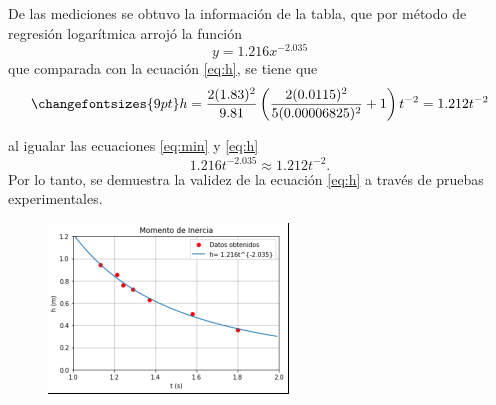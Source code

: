 \begin{minipage}{0.6\linewidth}
    De las mediciones se obtuvo la información de la tabla, que por método de
regresión logarítmica arrojó la función
\begin{equation}
    y=1.216x^{-2.035}
    \label{eq:min}
\end{equation}
que comparada con la ecuación \ref{eq:h}, se tiene que
\begin{equation}
    \changefontsizes{9pt}
    h=\frac{2(1.83)^2}{9.81} \left(\frac{2(0.0115)^2}{5(0.00006825)^2}+1 \right)t^{-2}= 1.212 t^{-2}
    \label{eq:h2}
\end{equation}
\end{minipage}
\begin{minipage}{0.55\linewidth}
    al igualar las ecuaciones \ref{eq:min} y \ref{eq:h} 
\begin{equation*}
    1.216t^{-2.035} \approx 1.212 t^{-2}.
\end{equation*}
Por lo tanto, se demuestra la validez de la ecuación \ref{eq:h} a través de pruebas experimentales.
\end{minipage}
\begin{minipage}{0.35\linewidth}
    \begin{figure}[H]
        \centering
        \includegraphics[scale=0.8]{Images/ima4.png}
    \end{figure}
\end{minipage}